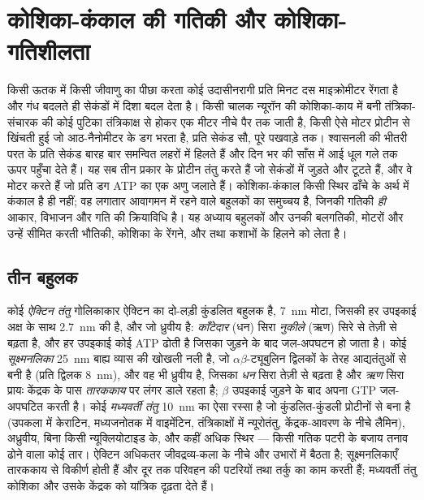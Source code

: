 \chapter{कोशिका-कंकाल की गतिकी और कोशिका-गतिशीलता}\label{ch:b3:cytoskeleton-motility}

किसी ऊतक में किसी जीवाणु का पीछा करता कोई उदासीनरागी प्रति मिनट दस
माइक्रोमीटर रेंगता है और गंध बदलते ही सेकंडों में दिशा बदल देता है।
किसी चालक न्यूरॉन की कोशिका-काय में बनी तंत्रिका-संचारक की कोई पुटिका
तंत्रिकाक्ष से होकर एक मीटर नीचे पैर तक जाती है, किसी ऐसे मोटर प्रोटीन
से खिंचती हुई जो आठ-नैनोमीटर के डग भरता है, प्रति सेकंड सौ, पूरे पखवाड़े
तक। श्वासनली की भीतरी परत के  प्रति सेकंड बारह बार समन्वित
लहरों में हिलते हैं और दिन भर की साँस में आई धूल गले तक ऊपर पहुँचा देते
हैं। यह सब तीन प्रकार के प्रोटीन तंतु करते हैं जो सेकंडों में जुड़ते और
टूटते हैं, और वे मोटर करते हैं जो प्रति डग ATP का एक अणु जलाते हैं।
कोशिका-कंकाल किसी स्थिर ढाँचे के अर्थ में कंकाल है ही नहीं; वह लगातार
आवागमन में रहने वाले बहुलकों का समुच्चय है, जिनकी गतिकी \emph{ही} आकार,
विभाजन और गति की क्रियाविधि है। यह अध्याय बहुलकों और उनकी बलगतिकी,
मोटरों और उन्हें सीमित करती भौतिकी, कोशिका के रेंगने, और  तथा
कशाभों के हिलने को लेता है।

\section{तीन बहुलक}

\begin{definition}\label{def:b3:cytoskeleton-motility:filaments}
कोई \emph{ऐक्टिन तंतु} गोलिकाकार ऐक्टिन का दो-लड़ी कुंडलित बहुलक है,
\qty{7}{nm} मोटा, जिसकी हर उपइकाई अक्ष के साथ \qty{2.7}{nm} की है, और
जो ध्रुवीय है: \emph{काँटेदार} (धन) सिरा \emph{नुकीले}
(ऋण) सिरे से तेज़ी से बढ़ता है, और हर उपइकाई कोई ATP ढोती है जिसका
जुड़ने के बाद जल-अपघटन हो जाता है। कोई \emph{सूक्ष्मनलिका} \qty{25}{nm}
बाह्य व्यास की खोखली नली है, जो $\alpha\beta$-ट्यूबुलिन द्विलकों के
तेरह आद्यतंतुओं से बनी है (प्रति द्विलक \qty{8}{nm}), और वह भी ध्रुवीय
है, जिसका \emph{धन} सिरा तेज़ी से बढ़ता है और \emph{ऋण} सिरा प्रायः
केंद्रक के पास \emph{तारककाय} पर लंगर डाले रहता है; $\beta$ उपइकाई
जुड़ने के बाद अपना GTP जल-अपघटित करती है। कोई \emph{मध्यवर्ती तंतु}
\qty{10}{nm} का ऐसा रस्सा है जो कुंडलित-कुंडली प्रोटीनों से बना है
(उपकला में केराटिन, मध्यजनोतक में वाइमेंटिन, तंत्रिकाक्षों में
न्यूरोतंतु, केंद्रक-आवरण के नीचे लैमिन), अध्रुवीय, बिना किसी
न्यूक्लियोटाइड के, और कहीं अधिक स्थिर --- किसी गतिक पटरी के बजाय तनाव
ढोने वाला कोई तार। ऐक्टिन अधिकतर जीवद्रव्य-कला के नीचे और उभारों में
बैठता है; सूक्ष्मनलिकाएँ तारककाय से विकीर्ण होती हैं और दूर तक परिवहन
की पटरियों तथा तर्कु का काम करती हैं; मध्यवर्ती तंतु कोशिका और उसके
केंद्रक को यांत्रिक दृढ़ता देते हैं।
\end{definition}

